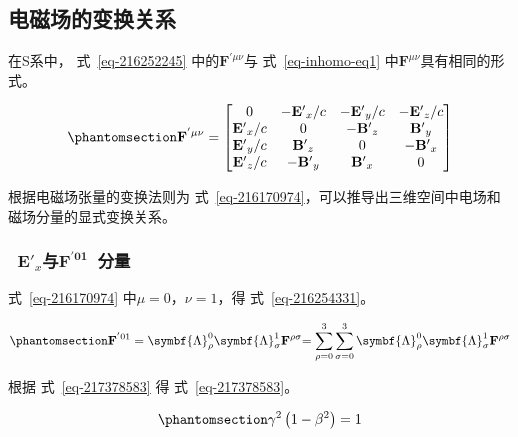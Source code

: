 \documentclass[
  chinese,
  a4paper,
  UTF8,
  12pt,
  oneside,
  openany]{ctexbook}
\begin{document}
\subsection{电磁场的变换关系}\label{ux7535ux78c1ux573aux7684ux53d8ux6362ux5173ux7cfb}

在S\textquotesingle 系中， 式~\ref{eq-216252245}
中的\(\mathbf{F}^{'\mu\nu}\)与 式~\ref{eq-inhomo-eq1}
中\(\mathbf{F}^{\mu\nu}\)具有相同的形式。

\begin{equation}\protect\phantomsection\label{eq-216252245}{
\mathbf{F}^{'\mu\nu} = \begin{bmatrix}
  0 & - {\mathbf{E}'}_{x}/c & - {\mathbf{E}'}_{y}/c & - {\mathbf{E}'}_{z}/c \\
  {\mathbf{E}'}_{x}/c & 0 & - {\mathbf{B}'}_{z} & {\mathbf{B}'}_{y} \\
  {\mathbf{E}'}_{y}/c & {\mathbf{B}'}_{z} & 0 & {- \mathbf{B}'}_{x} \\
  {\mathbf{E}'}_{z}/c & - {\mathbf{B}'}_{y} & {\mathbf{B}'}_{x} & 0
  \end{bmatrix}
}\end{equation}

根据电磁场张量的变换法则为
式~\ref{eq-216170974}，可以推导出三维空间中电场和磁场分量的显式变换关系。

\subsubsection{\texorpdfstring{~\({\mathbf{E}'}_{x}\)与\(\mathbf{F}^{\mathbf{'01}}\)~分量}{~\{\textbackslash mathbf\{E\}\textquotesingle\}\_\{x\}与\textbackslash mathbf\{F\}\^{}\{\textbackslash mathbf\{\}\}~分量}}\label{mathbfe_xux4e0emathbffmathbf01-ux5206ux91cf}

式~\ref{eq-216170974} 中\(\mu = 0\)，\(\nu = 1\)，得
式~\ref{eq-216254331}。

\begin{equation}\protect\phantomsection\label{eq-216254331}{
{\mathbf{F}^{'01} = \symbf{\Lambda}_{\rho}^{0}\symbf{\Lambda}_{\sigma}^{1}\mathbf{F}^{\rho\sigma}
  }{= \sum_{\rho = 0}^{3}{\sum_{\sigma = 0}^{3}{\symbf{\Lambda}_{\rho}^{0}\symbf{\Lambda}_{\sigma}^{1}\mathbf{F}^{\rho\sigma}}}}
}\end{equation}

根据 式~\ref{eq-217378583} 得 式~\ref{eq-217378583}。

\begin{equation}\protect\phantomsection\label{eq-217378583}{
\gamma^{2}\left( 1 - \beta^{2} \right) = 1
}\end{equation}
\end{document}
